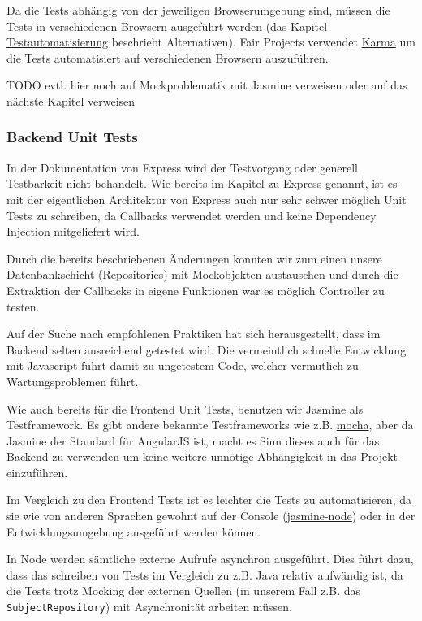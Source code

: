 Da die Tests abhängig von der jeweiligen Browserumgebung sind, müssen
die Tests in verschiedenen Browsern ausgeführt werden (das Kapitel
\url{Testautomatisierung} beschriebt Alternativen). Fair Projects
verwendet \href{http://karma-runner.github.io/0.13/index.html}{Karma} um
die Tests automatisiert auf verschiedenen Browsern auszuführen.

TODO evtl. hier noch auf Mockproblematik mit Jasmine verweisen oder auf
das nächste Kapitel verweisen

\subsubsection{Backend Unit Tests}\label{backend-unit-tests}

In der Dokumentation von Express wird der Testvorgang oder generell
Testbarkeit nicht behandelt. Wie bereits im Kapitel zu Express genannt,
ist es mit der eigentlichen Architektur von Express auch nur sehr schwer
möglich Unit Tests zu schreiben, da Callbacks verwendet werden und keine
Dependency Injection mitgeliefert wird.

Durch die bereits beschriebenen Änderungen konnten wir zum einen unsere
Datenbankschicht (Repositories) mit Mockobjekten austauschen und durch
die Extraktion der Callbacks in eigene Funktionen war es möglich
Controller zu testen.

Auf der Suche nach empfohlenen Praktiken hat sich herausgestellt, dass
im Backend selten ausreichend getestet wird. Die vermeintlich schnelle
Entwicklung mit Javascript führt damit zu ungetestem Code, welcher
vermutlich zu Wartungsproblemen führt.

Wie auch bereits für die Frontend Unit Tests, benutzen wir Jasmine als
Testframework. Es gibt andere bekannte Testframeworks wie z.B.
\href{https://mochajs.org/}{mocha}, aber da Jasmine der Standard für
AngularJS ist, macht es Sinn dieses auch für das Backend zu verwenden um
keine weitere unnötige Abhängigkeit in das Projekt einzuführen.

Im Vergleich zu den Frontend Tests ist es leichter die Tests zu
automatisieren, da sie wie von anderen Sprachen gewohnt auf der Console
(\href{https://github.com/mhevery/jasmine-node}{jasmine-node}) oder in
der Entwicklungsumgebung ausgeführt werden können.

In Node werden sämtliche externe Aufrufe asynchron ausgeführt. Dies
führt dazu, dass das schreiben von Tests im Vergleich zu z.B. Java
relativ aufwändig ist, da die Tests trotz Mocking der externen Quellen
(in unserem Fall z.B. das \texttt{SubjectRepository}) mit Asynchronität
arbeiten müssen.

